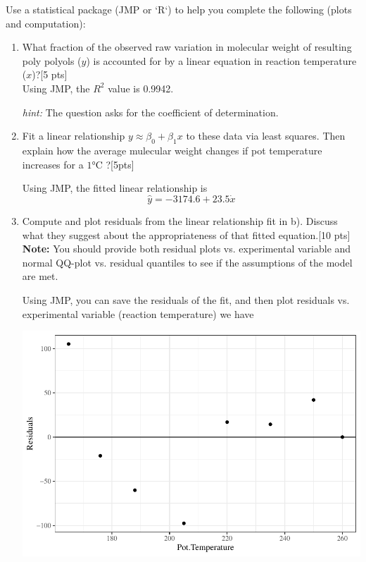 \documentclass[11pt]{article}\usepackage[]{graphicx}\usepackage[]{color}
\begin{document}
\begin{enumerate}
Use a statistical package (JMP or `R`) to help you complete the following (plots and computation):

   \begin{enumerate} 
    \item What fraction of the observed raw variation in molecular weight of resulting poly polyols ($y$) is accounted for by a linear equation in reaction temperature ($x$)?[5 pts]\\

Using JMP, the $R^2$ value is 0.9942.
    
    \emph{hint:} The question asks for the coefficient of determination.
    
    \item Fit a linear relationship $y \approx \beta_0 + \beta_1 x$ to these data via least squares. Then explain  how the average mulecular weight changes if pot temperature increases for a $1$°C ?[5pts]
    
    Using JMP, the fitted linear relationship is 
    $$\hat{y}= -3174.6 +23.5 \dot x $$
    
    \item Compute and plot residuals from the linear relationship fit in b). Discuss what they suggest about the appropriateness of that fitted equation.[10 pts]\\
        
    \textbf{Note:} You should provide both residual plots vs. experimental variable and normal QQ-plot vs. residual quantiles to see if the assumptions of the model are met.
    
    
    Using JMP, you can save the residuals of the fit, and then plot residuals vs. experimental variable (reaction temperature) we have 

\includegraphics{stat305-hw4_sol-005}
 

\end{enumerate}
\end{enumerate}
\end{document}
